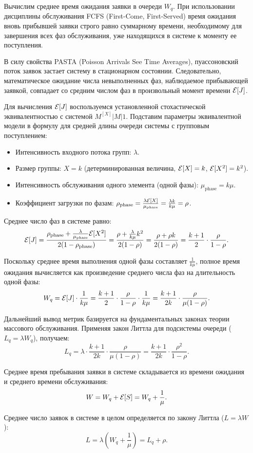 \begin{tproof}
Вычислим среднее время ожидания заявки в очереди $W_q$. При использовании дисциплины обслуживания FCFS (First-Come, First-Served) время ожидания вновь прибывшей заявки строго равно суммарному времени, необходимому для завершения всех фаз обслуживания, уже находящихся в системе к моменту ее поступления.

В силу свойства PASTA (Poisson Arrivals See Time Averages), пуассоновский поток заявок застает систему в стационарном состоянии. Следовательно, математическое ожидание числа невыполненных фаз, наблюдаемое прибывающей заявкой, совпадает со средним числом фаз в произвольный момент времени $\mathcal{E}[J]$.

Для вычисления $\mathcal{E}[J]$ воспользуемся установленной стохастической эквивалентностью с системой $M^{[X]}|M|1$. Подставим параметры эквивалентной модели в формулу для средней длины очереди системы с групповым поступлением:
\begin{itemize}
    \item Интенсивность входного потока групп: $\lambda$.
    \item Размер группы: $X = k$ (детерминированная величина, $\mathcal{E}[X] = k$, $\mathcal{E}[X^2] = k^2$).
    \item Интенсивность обслуживания одного элемента (одной фазы): $\mu_{\text{phase}} = k\mu$.
    \item Коэффициент загрузки по фазам: $\rho_{\text{phase}} = \frac{\lambda \mathcal{E}[X]}{\mu_{\text{phase}}} = \frac{\lambda k}{k\mu} = \rho$.
\end{itemize}

Среднее число фаз в системе равно:
$$ \mathcal{E}[J] = \frac{\rho_{\text{phase}} + \frac{\lambda}{\mu_{\text{phase}}} \mathcal{E}[X^2]}{2(1 - \rho_{\text{phase}})} = \frac{\rho + \frac{\lambda}{k\mu} k^2}{2(1 - \rho)} = \frac{\rho + \rho k}{2(1 - \rho)} = \frac{k+1}{2} \cdot \frac{\rho}{1 - \rho}. $$

Поскольку среднее время выполнения одной фазы составляет $\frac{1}{k\mu}$, полное время ожидания вычисляется как произведение среднего числа фаз на длительность одной фазы:
$$ W_q = \mathcal{E}[J] \cdot \frac{1}{k\mu} = \frac{k+1}{2} \cdot \frac{\rho}{1 - \rho} \cdot \frac{1}{k\mu} = \frac{k+1}{2k} \cdot \frac{\rho}{\mu(1 - \rho)}. $$

Дальнейший вывод метрик базируется на фундаментальных законах теории массового обслуживания. Применяя закон Литтла для подсистемы очереди ($L_q = \lambda W_q$), получаем:
$$ L_q = \lambda \cdot \frac{k+1}{2k} \cdot \frac{\rho}{\mu(1 - \rho)} = \frac{k+1}{2k} \cdot \frac{\rho^2}{1 - \rho}. $$

Среднее время пребывания заявки в системе складывается из времени ожидания и среднего времени обслуживания:
$$ W = W_q + \mathcal{E}[S] = W_q + \frac{1}{\mu}. $$

Среднее число заявок в системе в целом определяется по закону Литтла ($L = \lambda W$):
$$ L = \lambda \left( W_q + \frac{1}{\mu} \right) = L_q + \rho. $$
\end{tproof}


